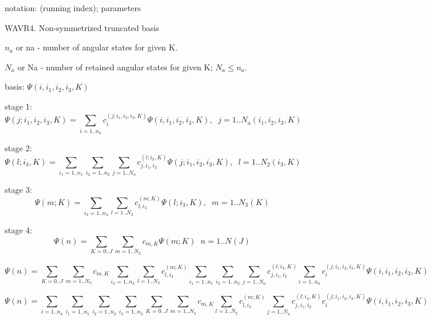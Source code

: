 
notation: (running index); parameters


WAVR4. Non-symmetrized truncated basis


$n_a$ or na - number of angular states for given K.

$N_a$ or Na - number of retained angular states for given K; $N_a \le n_a$.


basis: $\Psi (i, i_1, i_2, i_3, K)$

stage 1:
\begin{equation}
\Psi (j; i_1, i_2, i_3, K) = \sum_{i=1..n_a} c_{i}^{(j; i_1, i_2, i_3, K)} 
\Psi (i, i_1, i_2, i_3, K), \;\;
	j=1..N_a(i_1, i_2, i_3, K)
\end{equation}

stage 2:
\begin{equation}
\Psi (l; i_3, K) = \sum_{i_1=1..n_1} \sum_{i_2=1..n_2} \sum_{j=1..N_a} c_{j, i_1, i_2}^{(l; i_3, K)} 
\Psi (j; i_1, i_2, i_3, K), \;\;
	l=1..N_2(i_3, K)
\end{equation}

stage 3:
\begin{equation}
\Psi (m; K) = \sum_{i_3=1..n_3} \sum_{l=1..N_2} c_{l, i_3}^{(m; K)} 
\Psi (l; i_3, K), \;\;
	m=1..N_3(K)
\end{equation}

stage 4:
\begin{equation}
\Psi (n) = \sum_{K=0..J} \sum_{m=1..N_3} c_{m, K}
\Psi (m; K) \;\;
	n=1..N(J)
\end{equation}


\begin{equation}
\Psi (n) = \sum_{K=0..J} \sum_{m=1..N_3} c_{m, K} 
\sum_{i_3=1..n_3} \sum_{l=1..N_2} c_{l, i_3}^{(m; K)} 
\sum_{i_1=1..n_1} \sum_{i_2=1..n_2} \sum_{j=1..N_a} c_{j, i_1, i_2}^{(l; i_3, K)} 
\sum_{i=1..n_a} c_{i}^{(j; i_1, i_2, i_3, K)} 
\Psi (i, i_1, i_2, i_3, K)
\end{equation}

\begin{equation}
\Psi (n) = \sum_{i=1..n_a} \sum_{i_1=1..n_1} \sum_{i_2=1..n_2} \sum_{i_3=1..n_3} \sum_{K=0..J}
\sum_{m=1..N_3} c_{m, K} 
\sum_{l=1..N_2} c_{l, i_3}^{(m; K)} 
\sum_{j=1..N_a} c_{j, i_1, i_2}^{(l; i_3, K)} 
c_{i}^{(j; i_1, i_2, i_3, K)} 
\Psi (i, i_1, i_2, i_3, K)
\end{equation}

